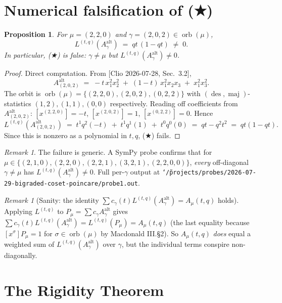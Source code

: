 \documentclass[11pt]{article}
\newtheorem{proposition}[theorem]{Proposition}
\theoremstyle{definition}
\theoremstyle{remark}
\newtheorem{remark}[theorem]{Remark}
\newcommand{\orb}{\operatorname{orb}}
\newcommand{\des}{\operatorname{des}}
\newcommand{\maj}{\operatorname{maj}}
\newcommand{\Aalt}{A^{\mathrm{alt}}}
\begin{document}
\section{Numerical falsification of (★)}\label{sec:falsify}

\begin{proposition}\label{prop:false}
For $\mu = (2,2,0)$ and $\gamma = (2,0,2) \in \orb(\mu)$,
\[
   L^{(t,q)}(\Aalt_{\gamma}) \;=\; qt\,(1 - qt) \;\ne\; 0.
\]
In particular, (★) is false: $\gamma \ne \mu$ but $L^{(t,q)}(\Aalt_\gamma) \ne 0$.
\end{proposition}

\begin{proof}
Direct computation. From [Clio 2026-07-28, Sec.\ 3.2],
\[
  \Aalt_{(2,0,2)} \;=\; -t\, x_1^2 x_2^2 \;+\; (1-t)\, x_1^2 x_2 x_3 \;+\; x_1^2 x_3^2.
\]
The orbit is $\orb(\mu) = \{(2,2,0),(2,0,2),(0,2,2)\}$ with $(\des,\maj)$-statistics
$(1,2), (1,1), (0,0)$ respectively. Reading off coefficients from
$\Aalt_{(2,0,2)}$: $[x^{(2,2,0)}] = -t$, $[x^{(2,0,2)}] = 1$, $[x^{(0,2,2)}] = 0$.
Hence
\[
  L^{(t,q)}(\Aalt_{(2,0,2)})
    \;=\; t^{1}q^{2}(-t) \;+\; t^{1}q^{1}(1) \;+\; t^{0}q^{0}(0)
    \;=\; qt - q^2 t^2 \;=\; qt(1-qt).
\]
Since this is nonzero as a polynomial in $t,q$, (★) fails.
\end{proof}

\begin{remark}\label{rem:general}
The failure is generic. A SymPy probe confirms that for
$\mu \in \{(2,1,0), (2,2,0), (2,2,1), (3,2,1), (2,2,0,0)\}$, \emph{every}
off-diagonal $\gamma \ne \mu$ has $L^{(t,q)}(\Aalt_\gamma) \ne 0$. Full
per-$\gamma$ output at
\texttt{\char`\~/projects/probes/2026-07-29-bigraded-coset-poincare/probe1.out}.
\end{remark}

\begin{remark}[Sanity: the identity $\sum c_\gamma(t) L^{(t,q)}(\Aalt_\gamma) = A_\mu(t,q)$ holds]
Applying $L^{(t,q)}$ to $P_\mu = \sum c_\gamma \Aalt_\gamma$ gives
$\sum c_\gamma(t) L^{(t,q)}(\Aalt_\gamma) = L^{(t,q)}(P_\mu) = A_\mu(t,q)$
(the last equality because $[x^\sigma] P_\mu = 1$ for $\sigma \in \orb(\mu)$
by Macdonald III.\S 2). So $A_\mu(t,q)$ \emph{does} equal a weighted sum of
$L^{(t,q)}(\Aalt_\gamma)$ over $\gamma$, but the individual terms conspire
non-diagonally.
\end{remark}

\section{The Rigidity Theorem}
\end{document}
